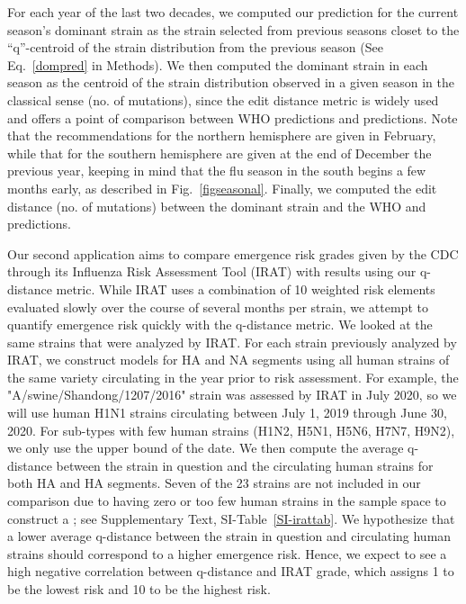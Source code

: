 \documentclass[onecolumn, compsoc,10pt]{IEEEtran}
\begin{document}

For each year of the last two decades, we computed our prediction for the current season's dominant strain as the strain selected from previous seasons closet to the ``q''-centroid of the strain distribution from the previous season (See Eq.~\eqref{dompred} in Methods). We then computed the dominant strain in each season as the centroid of the strain distribution observed in a given season in the classical sense (no. of mutations), since the edit distance metric is widely used and offers a point of comparison between WHO predictions and \qnet predictions. Note that the recommendations for the northern hemisphere are given in February, while that for the southern hemisphere are given at the end of December the previous year, keeping in mind that the flu season in the south begins a few months early, as described in Fig.~\ref{figseasonal}. Finally, we computed the edit distance (no. of mutations) between the dominant strain and the WHO and \qnet predictions.

Our second application aims to compare emergence risk grades given by the CDC through its Influenza Risk Assessment Tool (IRAT) with results using our q-distance metric. While IRAT uses a combination of 10 weighted risk elements evaluated slowly over the course of several months per strain, we attempt to quantify emergence risk quickly with the q-distance metric. We looked at the same strains that were analyzed by IRAT. For each strain previously analyzed by IRAT, we construct \qnet models for HA and NA segments using all human strains of the same variety circulating in the year prior to risk assessment. For example, the "A/swine/Shandong/1207/2016" strain was assessed by IRAT in July 2020, so we will use human H1N1 strains circulating between July 1, 2019 through June 30, 2020. For sub-types with few human strains (H1N2, H5N1, H5N6, H7N7, H9N2), we only use the upper bound of the date. We then compute the average q-distance between the strain in question and the circulating human strains for both HA and HA segments. Seven of the 23 strains are not included in our comparison due to having zero or too few human strains in the sample space to construct a \qnet; see Supplementary Text, SI-Table~\ref{SI-irattab}. We hypothesize that a lower average q-distance between the strain in question and circulating human strains should correspond to a higher emergence risk. Hence, we expect to see a high negative correlation between q-distance and IRAT grade, which assigns 1 to be the lowest risk and 10 to be the highest risk.
\end{document}
